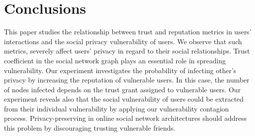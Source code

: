 \section{Conclusions} \label{sec:Conclusions}

This paper studies the relationship between trust and reputation metrics in users' interactions and the social privacy vulnerability of users.
We observe that such metrics,
	severely affect users’ privacy in regard to their social relationships.
Trust coefficient in the social network graph plays an essential role in spreading vulnerability.
Our experiment investigates the probability of infecting other's privacy by increasing the reputation of vulnerable users.
In this case,
	the number of nodes infected depends on the trust grant assigned to vulnerable users.
Our experiment reveals also that the social vulnerability of users could be extracted from their individual vulnerability by applying our vulnerability contagion process.
Privacy-preserving in online social network architectures should address this problem by discouraging trusting vulnerable friends.
	



